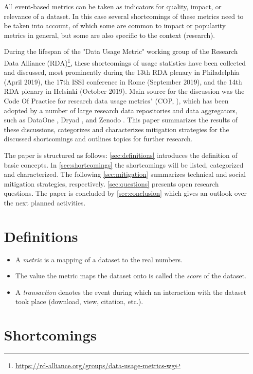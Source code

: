 \documentclass[conference, a4paper]{IEEEtran}\usepackage[]{graphicx}\usepackage[]{color}
\begin{document}
All event-based metrics can be taken as indicators for
quality, impact, or relevance of a dataset.
In this case several shortcomings of these metrics need to be taken into account,
of which some are common to impact or popularity metrics in general,
but some are also specific to the context (research).

During the lifespan of the "Data Usage Metric" working group of the Research Data Alliance (RDA)\footnote{\url{https://rd-alliance.org/groups/data-usage-metrics-wg}},
these shortcomings of usage statistics have been collected and discussed,
most prominently during the 13th RDA plenary in Philadelphia (April 2019),
the 17th ISSI conference in Rome (September 2019),
and the 14th RDA plenary in Helsinki (October 2019).
Main source for the discussion was the
Code Of Practice for research data usage metrics" (COP, \cite{cop}),
which has been adopted by a number of large research data repositories and data aggregators,
such as DataOne \cite{dataone},
Dryad \cite{dryad},
and Zenodo \cite{zenodo}.
This paper summarizes the results of these discussions,
categorizes and characterizes mitigation strategies for the discussed shortcomings
and outlines topics for further research.

The paper is structured as follows:
\autoref{sec:definitions} introduces the definition of basic concepts.
In \autoref{sec:shortcomings} the shortcomings will be listed, categorized and characterized.
The following \autoref{sec:mitigation} summarizes technical and social mitigation strategies,
respectively.
\autoref{sec:questions} presents open research questions.
The paper is concluded by \autoref{sec:conclusion} which gives an outlook
over the next planned activities.

\section{Definitions}\label{sec:definitions}
\begin{itemize}
    \item A \emph{metric} is a mapping of a dataset to the real numbers.
    \item The value the metric maps the dataset onto is called the \emph{score} of the dataset.
    \item A \emph{transaction} denotes the event during which an interaction with the dataset
        took place (download, view, citation, etc.).
\end{itemize}

\section{Shortcomings}\label{sec:shortcomings}
\end{document}
